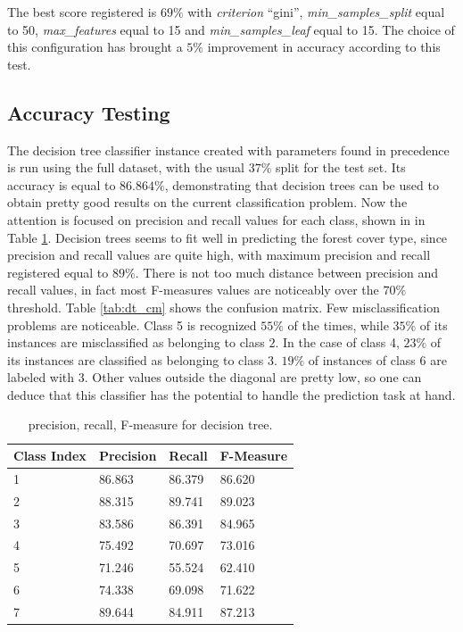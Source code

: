 \documentclass[a4paper, 10pt]{article}
\begin{document}
The best score registered is $69\%$ with \emph{criterion} ``gini'', \emph{min\_samples\_split} equal to 50, \emph{max\_features} equal to 15 and \emph{min\_samples\_leaf} equal to 15. The choice of this configuration has brought a $5\%$ improvement in accuracy according to this test. 
 
 
\subsection{Accuracy Testing}

The decision tree classifier instance created with parameters found in precedence is run using the full dataset, with the usual $37\%$ split for the test set. Its accuracy is equal to $86.864\%$, demonstrating that decision trees can be used to obtain pretty good results on the current classification problem. Now the attention is focused on precision and recall values for each class, shown in in Table \ref{tab:dt_test_pr}. Decision trees seems to fit well in predicting the forest cover type, since precision and recall values are quite high, with maximum precision and recall registered equal to $89\%$. There is not too much distance between precision and recall values, in fact most F-measures values are noticeably over the $70\%$ threshold. Table \ref{tab:dt_cm} shows the confusion matrix. Few misclassification problems are noticeable. Class 5 is recognized $55\%$ of the times, while $35\%$ of its instances are misclassified as belonging to class $2$. In the case of class 4, $23\%$ of its instances are classified as belonging to class 3. $19\%$ of instances of class 6 are labeled with $3$. Other values outside the diagonal are pretty low, so one can deduce that this classifier has the potential to handle the prediction task at hand. 
 
\begin{table}[H]
\centering
\begin{tabular}{|l|l|l|l|}
\hline
\textbf{Class Index} & \textbf{Precision} & \textbf{Recall} & \textbf{F-Measure}\\\hline
1 & 86.863 & 86.379& 86.620\\\hline
2 & 88.315 & 89.741& 89.023\\\hline
3 & 83.586 & 86.391& 84.965\\\hline
4 & 75.492 & 70.697& 73.016\\\hline
5 & 71.246 & 55.524& 62.410\\\hline
6 & 74.338 & 69.098& 71.622\\\hline
7 & 89.644 & 84.911& 87.213\\\hline
\end{tabular}
\caption{precision, recall, F-measure for decision tree.}
\label{tab:dt_test_pr}
\end{table}
\end{document}
